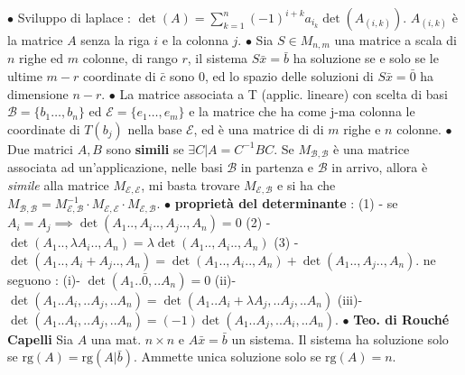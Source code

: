 \documentclass[1pt, letterpaper]{article}
\newcommand{\E}{{\mathcal E}}
\newcommand{\B}{{\mathcal B}}
\newcommand{\rg}{{\text{rg}}}
\newcommand{\fdot}{{\(\bullet\) }}
\begin{document}
   
   \newpage
 \fdot Sviluppo di laplace : \(\det(A)=\displaystyle\sum_{k=1}^n(-1)^{i+k}a_{i_k}\det(A_{(i,k)})\). \(A_{(i,k)}\) è la matrice \(A\) senza la riga \(i\) e la colonna \(j\). \fdot Sia \(S\in M_{n,m}\) una matrice a 
   scala di \(n\) righe ed \(m\) colonne, di rango \(r\), il sistema \(S\bar x=\bar b\) ha soluzione se e solo se le ultime \(m-r\) coordinate di \(\bar c\) sono 0, ed lo spazio delle soluzioni di \(S\bar x = \bar 0\) ha 
   dimensione \(n-r\). \fdot La matrice associata a T (applic. lineare) con scelta di basi \(\B=\{b_1\dots,b_n\}\) ed \(\E=\{e_1\dots,e_m\}\) e la matrice che ha come j-ma colonna le coordinate di \(T(b_j)\) 
   nella base \(\E\), ed è una matrice di di \(m\) righe e \(n\) colonne. \fdot Due matrici \(A,B\) sono \textbf{simili} se  \(\exists C|A=C^{-1}BC\). Se \(M_{\B,\B}\) è una matrice associata ad un'applicazione, 
   nelle basi \(\B\) in partenza e \(\B\) in arrivo, allora è \textit{simile} alla matrice \(M_{\E,\E}\), mi basta trovare \(M_{\E,\B}\) e si ha che \(M_{\B,\B}=M_{\E,\B}^{-1}\cdot M_{\E,\E}\cdot M_{\E,\B}\).
   \fdot \textbf{proprietà del determinante} : 
   (1) - se \(A_i=A_j\implies\det(A_1..,A_i..,A_j..,A_n)=0\) (2) - \(\det(A_1..,\lambda A_i..,A_n)=\lambda\det(A_1.., A_i..,A_n)\) (3) - \(\det(A_1.., A_i+A_j..,A_n)=
   \det(A_1.., A_i..,A_n)+\det(A_1.., A_j..,A_n)\).
   ne seguono : (i)- 
   \(\det(A_1..\bar 0,.. A_n)=0\) (ii)- \(\det(A_1.. A_i,.. A_j,.. A_n)=\det(A_1.. A_i+\lambda A_j,.. A_j,.. A_n)\) (iii)- \(\det(A_1.. A_i,.. A_j,.. A_n)=(-1)\det(A_1.. A_j,.. A_i,.. A_n)\).
   \fdot \textbf{Teo. di Rouché Capelli} Sia \(A\) una mat. \(n\times n\) e \(A\bar x=\bar b\) un sistema. Il sistema ha soluzione solo se \(\rg(A)=\rg(A|\bar b)\). Ammette unica soluzione solo se \(\rg(A)=n\). 
   
 
\end{document}
